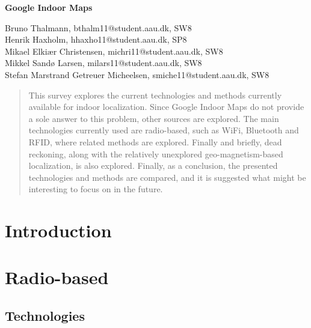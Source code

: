 \documentclass[12pt,a4paper]{article}
\begin{document}
\begin{center}
\bigskip\bigskip
{\Large\bf Google Indoor Maps}
\bigskip\bigskip


Bruno Thalmann, bthalm11@student.aau.dk, SW8\\
Henrik Haxholm, hhaxho11@student.aau.dk, SP8\\
Mikael Elkiær Christensen, michri11@student.aau.dk, SW8\\
Mikkel Sandø Larsen, milars11@student.aau.dk, SW8\\
Stefan Marstrand Getreuer Micheelsen, smiche11@student.aau.dk, SW8

\bigskip
\begin{abstract}
This survey explores the current technologies and methods currently available for indoor localization.
Since Google Indoor Maps do not provide a sole answer to this problem, other sources are explored.
The main technologies currently used are radio-based, such as WiFi, Bluetooth and RFID, where related methods are explored.
Finally and briefly, dead reckoning, along with the relatively unexplored geo-magnetism-based localization, is also explored.
Finally, as a conclusion, the presented technologies and methods are compared, and it is suggested what might be interesting to focus on in the future.
\end{abstract}

\thispagestyle{empty}
\end{center}


\titlepage



\thispagestyle{plain}


\section{Introduction}


\section{Radio-based}

\subsection{Technologies}




\end{document}
